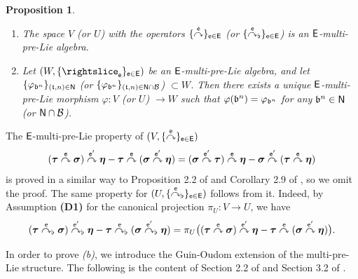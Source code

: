 \documentclass[10pt, reqno]{amsart}
\numberwithin{subsection}{section}
\numberwithin{subsubsection}{subsection}
\numberwithin{equation}{section} %
\theoremstyle{mystyle}
\theoremstyle{mystyle2}
\newtheorem*{prop*} {Proposition}
\theoremstyle{mystyle3}
\newcommand{\bstau}{\boldsymbol{\tau}}
\newcommand{\bssigma}{\boldsymbol{\sigma}}
\newcommand{\bseta}{\boldsymbol{\eta}}
\newcommand{\grafting}{\overset{\sf e}{\curvearrowright}}
\newcommand{\flatgrafting}{\overset{\sf e}{\curvearrowright}_{\flat}}
\newcommand{\mcB}{\mathcal{B}}
\begin{document}
\medskip

\begin{prop*}
\begin{enumerate}
\setlength{\itemsep}{0.15cm}
\item The space $V$ (or $U$) with the operators $\{\grafting\}_{\sf e\in E}$ (or $\{\flatgrafting\}_{\sf e\in E}$) is an ${\sf E}$-multi-pre-Lie algebra.
\item Let $(W,\{\rightslice_{\sf {e}}\}_{\sf{e}\in\sf{E}})$ be an $\sf E$-multi-pre-Lie algebra, and let $\{\varphi_{\frak{b}^n}\}_{(\frak{t},n)\in{\sf N}}$ (or $\{\varphi_{\frak{b}^n}\}_{(\frak{t},n)\in{\sf N}\cap\mcB}$) $\subset W$.
Then there exists a unique $\sf E$-multi-pre-Lie morphism $\varphi:V$ (or 
$U$) $\to W$ such that $\varphi(\frak{b}^n)=\varphi_{\frak{b}^n}$ for any $\frak{b}^n\in{\sf N}$ (or ${\sf N}\cap\mcB$).
\end{enumerate}
\end{prop*}

\medskip

The ${\sf E}$-multi-pre-Lie property of $(V,\{\grafting\}_{\sf e\in E})$
$$
(\bstau\overset{\sf e}{\curvearrowright}\bssigma)\overset{{\sf e}'}{\curvearrowright}\bseta
-\bstau\overset{\sf e}{\curvearrowright}(\bssigma\overset{{\sf e}'}{\curvearrowright}\bseta)
=
(\bssigma\overset{{\sf e}'}{\curvearrowright}\bstau)\overset{\sf e}{\curvearrowright}\bseta
-\bssigma\overset{{\sf e}'}{\curvearrowright}(\bstau\overset{\sf e}{\curvearrowright}\bseta)
$$
is proved in a similar way to Proposition 2.2 of \cite{FoissyTypedTrees} and Corollary 2.9 of \cite{BM23}, so we omit the proof. The same property for $(U,\{\flatgrafting\}_{\sf e\in E})$ follows from it. Indeed, by Assumption \textbf{\textsf{(D1)}} for the canonical projection $\pi_U:V\to U$, we have
$$
(\bstau\overset{\sf e}{\curvearrowright}_\flat\bssigma)\overset{{\sf e}'}{\curvearrowright}_\flat\bseta
-\bstau\overset{\sf e}{\curvearrowright}_\flat(\bssigma\overset{{\sf e}'}{\curvearrowright}_\flat\bseta)
=
\pi_U\big(
(\bstau\overset{\sf e}{\curvearrowright}\bssigma)\overset{{\sf e}'}{\curvearrowright}\bseta
-\bstau\overset{\sf e}{\curvearrowright}(\bssigma\overset{{\sf e}'}{\curvearrowright}\bseta)
\big).
$$

In order to prove \textit{\textsf{(b)}}, we introduce the Guin-Oudom extension of the multi-pre-Lie structure. The following is the content of Section 2.2 of \cite{FoissyTypedTrees} and Section 3.2 of \cite{BM23}.

\medskip
\end{document}
